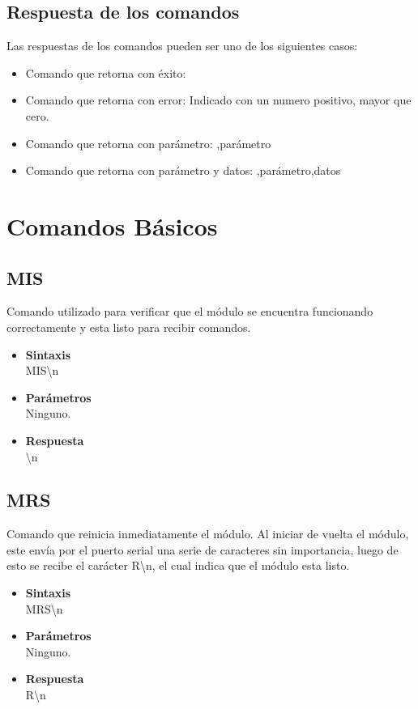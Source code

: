 \documentclass[a4paper,spanish]{article}
\begin{document}
\subsection{Respuesta de los comandos}
Las respuestas de los comandos pueden ser uno de los siguientes casos: 
\begin{itemize}
	\item Comando que retorna con éxito: {}
	\item Comando que retorna con error: Indicado con un numero positivo, mayor que cero.
	\item Comando que retorna con parámetro: {,parámetro}
	\item Comando que retorna con parámetro y datos: {,parámetro,datos}
\end{itemize}
\section{Comandos Básicos}

\subsection{MIS}
Comando utilizado para verificar que el módulo se encuentra funcionando correctamente y esta listo para recibir comandos.
\begin{itemize}
	\item \textbf{Sintaxis}\\
	{\ttfamily MIS\textbackslash n}
	\item \textbf{Parámetros}\\
	Ninguno.
	\item \textbf{Respuesta}\\
	{\textbackslash n}
\end{itemize}

\subsection{MRS}
Comando que reinicia inmediatamente el módulo. Al iniciar de vuelta el módulo, este envía por el puerto serial una serie de caracteres sin importancia, luego de esto se recibe el carácter {\ttfamily R\textbackslash n}, el cual indica que el módulo esta listo.
\begin{itemize}
	\item \textbf{Sintaxis}\\
	{\ttfamily MRS\textbackslash n}
	\item \textbf{Parámetros}\\
	Ninguno.
	\item \textbf{Respuesta}\\
	{\ttfamily R\textbackslash n}
\end{itemize}
\end{document}
